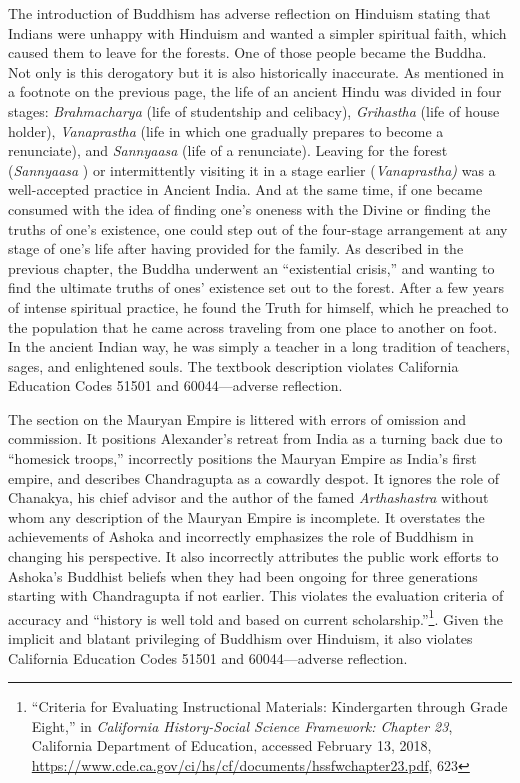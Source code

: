 The introduction of Buddhism has adverse reflection on Hinduism stating that Indians were unhappy with Hinduism and wanted a simpler spiritual faith, which caused them to leave for the forests. One of those people became the Buddha. Not only is this derogatory but it is also historically inaccurate. As mentioned in a footnote on the previous page, the life of an ancient Hindu was divided in four stages: \textit{Brahmacharya}  (life of studentship and celibacy), \textit{Grihastha}  (life of house holder), \textit{Vanaprastha}  (life in which one gradually prepares to become a renunciate), and \textit{Sannyaasa}  (life of a renunciate). Leaving for the forest (\textit{Sannyaasa} ) or intermittently visiting it in a stage earlier (\textit{Vanaprastha)}  was a well-accepted practice in Ancient India. And at the same time, if one became consumed with the idea of finding one’s oneness with the Divine or finding the truths of one’s existence, one could step out of the four-stage arrangement at any stage of one’s life after having provided for the family. As described in the previous chapter, the Buddha underwent an “existential crisis,” and wanting to find the ultimate truths of ones’ existence set out to the forest. After a few years of intense spiritual practice, he found the Truth for himself, which he preached to the population that he came across traveling from one place to another on foot. In the ancient Indian way, he was simply a teacher in a long tradition of teachers, sages, and enlightened souls. The textbook description violates California Education Codes 51501 and 60044—adverse reflection.  

The section on the Mauryan Empire is littered with errors of omission and commission. It positions Alexander’s retreat from India as a turning back due to “homesick troops,” incorrectly positions the Mauryan Empire as India’s first empire, and describes Chandragupta as a cowardly despot. It ignores the role of Chanakya, his chief advisor and the author of the famed \textit{Arthashastra}  without whom any description of the Mauryan Empire is incomplete. It overstates the achievements of Ashoka and incorrectly emphasizes the role of Buddhism in changing his perspective. It also incorrectly attributes the public work efforts to Ashoka’s Buddhist beliefs when they had been ongoing for three generations starting with Chandragupta if not earlier. This violates the evaluation criteria of accuracy and “history is well told and based on current scholarship.”\footnote{“Criteria for Evaluating Instructional Materials: Kindergarten through Grade Eight,” in \textit{California History-Social Science Framework: Chapter 23}, California Department of Education, accessed February 13, 2018, \url{https://www.cde.ca.gov/ci/hs/cf/documents/hssfwchapter23.pdf}, 623}. Given the implicit and blatant privileging of Buddhism over Hinduism, it also violates California Education Codes 51501 and 60044—adverse reflection.  

